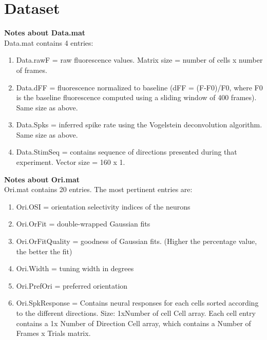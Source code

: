 \documentclass[11pt]{article}
\begin{document}
\section{Dataset} %
\label{sec:dataset}

\textbf{Notes about Data.mat}\\
Data.mat contains 4 entries:
\begin{enumerate}
    \item Data.rawF =  raw fluorescence values. Matrix size = number of cells x number of frames.
    \item Data.dFF    = fluorescence normalized to baseline (dFF =  (F-F0)/F0, where F0 is the baseline fluorescence computed using a sliding window of 400 frames). Same size as above.
    \item Data.Spks  = inferred spike rate using the Vogelstein deconvolution algorithm. Same size as above.
    \item Data.StimSeq = contains sequence of directions presented during that experiment. Vector size = 160 x 1.
\end{enumerate}
\textbf{Notes about Ori.mat}\\
Ori.mat contains 20 entries. The most pertinent entries are:
\begin{enumerate}
    \item Ori.OSI = orientation selectivity indices of the neurons
    \item Ori.OrFit = double-wrapped Gaussian fits
    \item Ori.OrFitQuality  = goodness of Gaussian fits. (Higher the percentage value, the better the fit)
    \item Ori.Width = tuning width in degrees
    \item Ori.PrefOri = preferred orientation
    \item Ori.SpkResponse = Contains neural responses for each cells sorted according to the different directions. Size: 1xNumber of cell Cell array. Each cell entry contains a 1x Number of Direction Cell array, which contains a Number of Frames x Trials matrix.
\end{enumerate}
\end{document}

